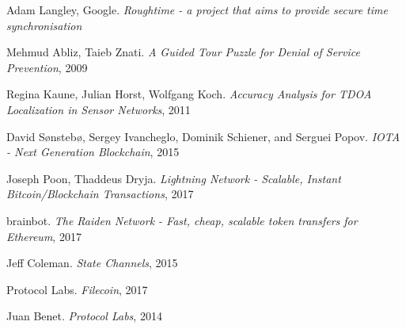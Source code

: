 \documentclass[10pt, nonatbib, nocopyrightspace, reprint]{sigplanconf}
\begin{document}
\begin{thebibliography}{10}
    Adam Langley, Google. 
    \emph{Roughtime - a project that aims to provide secure time synchronisation}

    Mehmud Abliz, Taieb Znati. 
    \emph{A Guided Tour Puzzle for Denial of Service Prevention}, 2009

    Regina Kaune, Julian Horst, Wolfgang Koch. 
    \emph{Accuracy Analysis for TDOA Localization in Sensor Networks}, 2011

    David Sønstebø, Sergey Ivancheglo, Dominik Schiener, and Serguei Popov. 
    \emph{IOTA - Next Generation Blockchain}, 2015

    Joseph Poon, Thaddeus Dryja. 
    \emph{Lightning Network - Scalable, Instant Bitcoin/Blockchain Transactions}, 2017

    brainbot. 
    \emph{The Raiden Network - Fast, cheap, scalable token transfers for Ethereum}, 2017

    Jeff Coleman. 
    \emph{State Channels}, 2015

    Protocol Labs. 
    \emph{Filecoin}, 2017

    Juan Benet. 
    \emph{Protocol Labs}, 2014

\end{thebibliography}
\end{document}
